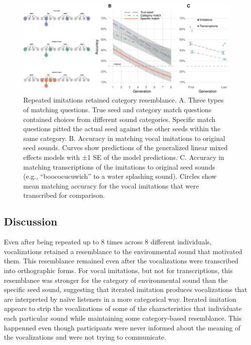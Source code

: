 \documentclass[english,floatsintext,man]{apa6}
\theoremstyle{definition}
\theoremstyle{definition}
\theoremstyle{definition}
\theoremstyle{remark}
\begin{document}
\begin{figure}
\centering
\includegraphics{fig3-1.pdf}
\caption{\label{fig:fig3}Repeated imitations retained category resemblance.
A. Three types of matching questions. True seed and category match
questions contained choices from different sound categories. Specific
match questions pitted the actual seed against the other seeds within
the same category. B. Accuracy in matching vocal imitations to original
seed sounds. Curves show predictions of the generalized linear mixed
effects models with ±1 SE of the model predictions. C. Accuracy in
matching transcriptions of the imitations to original seed sounds (e.g.,
\enquote{boococucuwich} to a water splashing sound). Circles show mean
matching accuracy for the vocal imitations that were transcribed for
comparison.}
\end{figure}

\hypertarget{discussion-1}{%
\subsection{Discussion}\label{discussion-1}}

Even after being repeated up to 8 times across 8 different individuals,
vocalizations retained a resemblance to the environmental sound that
motivated them. This resemblance remained even after the vocalizations
were transcribed into orthographic forms. For vocal imitations, but not
for transcriptions, this resemblance was stronger for the category of
environmental sound than the specific seed sound, suggesting that
iterated imitation produces vocalizations that are interpreted by naïve
listeners in a more categorical way. Iterated imitation appears to strip
the vocalizations of some of the characteristics that individuate each
particular sound while maintaining some category-based resemblance. This
happenned even though participants were never informed about the meaning
of the vocalizations and were not trying to communicate.
\end{document}
